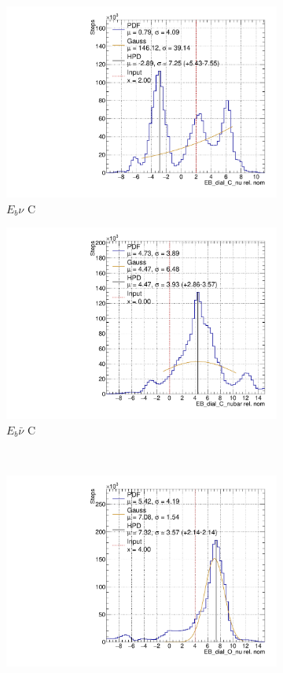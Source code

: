 \begin{figure}
\centering
\begin{subfigure}{.48\textwidth}
  \centering
  \includegraphics[width=0.73\linewidth]{figs/EB_dial_C_nuData}
  \caption{$E_{b}\nu$ C}
\end{subfigure}
\begin{subfigure}{.48\textwidth}
  \centering
  \includegraphics[width=0.73\linewidth]{figs/EB_dial_C_nubarData}
  \caption{$E_{b}\bar{\nu}$ C}
\end{subfigure} \\
\begin{subfigure}{.48\textwidth}
  \centering
  \includegraphics[width=0.73\linewidth]{figs/EB_dial_O_nuData}

\end{subfigure}
\end{figure}
